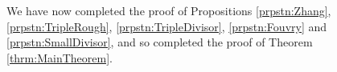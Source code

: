 \documentclass[10pt]{amsart}
\theoremstyle{plain}
\numberwithin{equation}{section}
\begin{document}
%
%
%
%
%
%
%
%
We have now completed the proof of Propositions \ref{prpstn:Zhang}, \ref{prpstn:TripleRough}, \ref{prpstn:TripleDivisor}, \ref{prpstn:Fouvry} and \ref{prpstn:SmallDivisor}, and so completed the proof of Theorem \ref{thrm:MainTheorem}.
%
%
%
%
%
%
%
%
%


\end{document}
